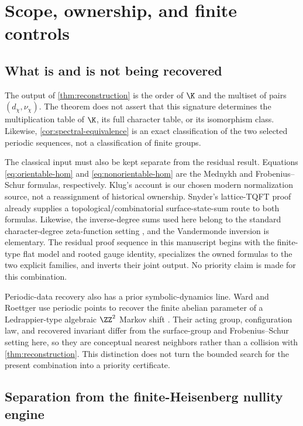 \section{Scope, ownership, and finite controls}
\label{sec:scope}

\subsection{What is and is not being recovered}

The output of \cref{thm:reconstruction} is the order of $\K$ and the multiset
of pairs $(d_\chi,\nu_\chi)$.  The theorem does not assert that this signature
determines the multiplication table of $\K$, its full character table, or its
isomorphism class.  Likewise, \cref{cor:spectral-equivalence} is an exact
classification of the two selected periodic sequences, not a classification
of finite groups.

The classical input must also be kept separate from the residual result.
Equations \eqref{eq:orientable-hom} and \eqref{eq:nonorientable-hom} are the
Mednykh and Frobenius--Schur formulas, respectively.  Klug's account
\cite{Klug2025} is our chosen modern normalization source, not a reassignment
of historical ownership.  Snyder's lattice-TQFT proof \cite{Snyder2007}
already supplies a topological/combinatorial surface-state-sum route to both
formulas.  Likewise, the inverse-degree sums used here belong to the standard
character-degree zeta-function setting \cite{LiebeckShalev2005}, and the
Vandermonde inversion is elementary.  The residual proof sequence in this
manuscript begins with the finite-type flat model and rooted gauge identity,
specializes the owned formulas to the two explicit families, and inverts their
joint output.  No priority claim is made for this combination.

Periodic-data recovery also has a prior symbolic-dynamics line.  Ward and
Roettger use periodic points to recover the finite abelian parameter of a
Ledrappier-type algebraic $\ZZ^2$ Markov shift
\cite{Ward1998,Roettger2005}.  Their acting group, configuration law, and
recovered invariant differ from the surface-group and Frobenius--Schur setting
here, so they are conceptual nearest neighbors rather than a collision with
\cref{thm:reconstruction}.  This distinction does not turn the bounded search
for the present combination into a priority certificate.

\subsection{Separation from the finite-Heisenberg nullity engine}

